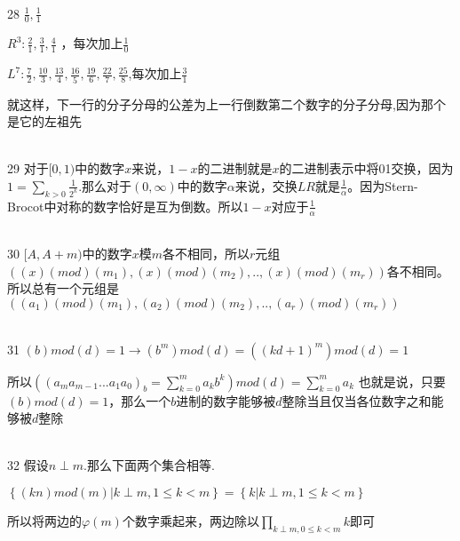 \documentclass[onecolumn]{article}
\begin{document}
~\\
28 $\frac{1}{0},\frac{1}{1}$ \par
$R^{3}:\frac{2}{1},\frac{3}{1},\frac{4}{1}$ ，每次加上$\frac{1}{0}$ \par
$L^{7}:\frac{7}{2},\frac{10}{3},\frac{13}{4},\frac{16}{5},\frac{19}{6},\frac{22}{7},\frac{25}{8}$,每次加上$\frac{3}{1}$ \par
就这样，下一行的分子分母的公差为上一行倒数第二个数字的分子分母,因为那个是它的左祖先 \par
~\\
29 对于$[0,1)$中的数字$x$来说，$1-x$的二进制就是$x$的二进制表示中将01交换，因为$1=\sum_{k>0}\frac{1}{2^{k}}$.那么对于$(0,\infty )$$中的数字\alpha$来说，交换$LR$就是$\frac{1}{\alpha}$。因为Stern-Brocot中对称的数字恰好是互为倒数。所以$1-x$对应于$\frac{1}{\alpha}$\par
~\\
30 $[A,A+m)$中的数字$x$模$m$各不相同，所以$r$元组$((x)(mod)(m_{1}),(x)(mod)(m_{2}),..,(x)(mod)(m_{r}))$各不相同。所以总有一个元组是$((a_{1})(mod)(m_{1}),(a_{2})(mod)(m_{2}),..,(a_{r})(mod)(m_{r}))$ \par
~\\

31 $(b)mod(d)=1\rightarrow (b^{m})mod(d)=((kd+1)^{m})mod(d)=1$\par
所以$((a_{m}a_{m-1}...a_{1}a_{0})_{b}=\sum_{k=0}^{m}a_{k}b^{k})mod(d)=\sum_{k=0}^{m}a_{k}$ 也就是说，只要$(b)mod(d)=1$，那么一个$b$进制的数字能够被$d$整除当且仅当各位数字之和能够被$d$整除\par
~\\
32 假设$n\perp m$.那么下面两个集合相等. \par
$\left \{ (kn)mod(m)|k\perp m ,1\le k <m\right \}=\left \{ k|k\perp m ,1\le k <m \right \}$\par
所以将两边的$\varphi (m)$个数字乘起来，两边除以$\prod _{k\perp m ,0\le k <m}k$即可 \par
~\\
\end{document}

